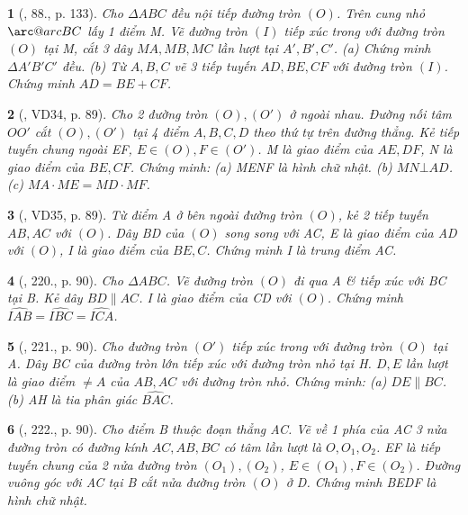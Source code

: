\documentclass{article}
\makeatletter
\newcommand{\arc@char}{{\usefont{U}{tipa}{m}{n}\symbol{62}}}%
\newcommand{\arc}[1]{\mathpalette\arc@arc{#1}}
\newcommand{\arc@arc}[2]{%
	\sbox0{$\m@th#1#2$}%
	\vbox{
		\hbox{\resizebox{\wd0}{\height}{\arc@char}}
		\nointerlineskip
		\box0
	}%
}
\newtheorem{baitoan}{}
\makeatother
\begin{document}
\begin{baitoan}[\cite{Tuyen_Toan_9_old}, 88., p. 133]
	Cho $\Delta ABC$ đều nội tiếp đường tròn $(O)$. Trên cung nhỏ $\arc{BC}$ lấy 1 điểm M. Vẽ đường tròn $(I)$ tiếp xúc trong với đường tròn $(O)$ tại M, cắt 3 dây $MA,MB,MC$ lần lượt tại $A',B',C'$. (a) Chứng minh $\Delta A'B'C'$ đều. (b) Từ $A,B,C$ vẽ 3 tiếp tuyến $AD,BE,CF$ với đường tròn $(I)$. Chứng minh $AD = BE + CF$.
\end{baitoan}

\begin{baitoan}[\cite{Binh_Toan_9_tap_2}, VD34, p. 89]
	Cho 2 đường tròn $(O),(O')$ ở ngoài nhau. Đường nối tâm $OO'$ cắt $(O),(O')$ tại 4 điểm $A,B,C,D$ theo thứ tự trên đường thẳng. Kẻ tiếp tuyến chung ngoài EF, $E\in(O),F\in(O')$. M là giao điểm của $AE,DF$, N là giao điểm của $BE,CF$. Chứng minh: (a) MENF là hình chữ nhật. (b) $MN\bot AD$. (c) $MA\cdot ME = MD\cdot MF$.
\end{baitoan}

\begin{baitoan}[\cite{Binh_Toan_9_tap_2}, VD35, p. 89]
	Từ điểm A ở bên ngoài đường tròn $(O)$, kẻ 2 tiếp tuyến $AB,AC$ với $(O)$. Dây BD của $(O)$ song song với AC, E là giao điểm của AD với $(O)$, I là giao điểm của $BE,C$. Chứng minh I là trung điểm AC.
\end{baitoan}

\begin{baitoan}[\cite{Binh_Toan_9_tap_2}, 220., p. 90]
	Cho $\Delta ABC$. Vẽ đường tròn $(O)$ đi qua A \& tiếp xúc với BC tại B. Kẻ dây $BD\parallel AC$. I là giao điểm của CD với $(O)$. Chứng minh $\widehat{IAB} = \widehat{IBC} = \widehat{ICA}$.
\end{baitoan}

\begin{baitoan}[\cite{Binh_Toan_9_tap_2}, 221., p. 90]
	Cho đường tròn $(O')$ tiếp xúc trong với đường tròn $(O)$ tại A. Dây BC của đường tròn lớn tiếp xúc với đường tròn nhỏ tại H. $D,E$ lần lượt là giao điểm $\ne A$ của $AB,AC$ với đường tròn nhỏ. Chứng minh: (a) $DE\parallel BC$. (b) AH là tia phân giác $\widehat{BAC}$.
\end{baitoan}

\begin{baitoan}[\cite{Binh_Toan_9_tap_2}, 222., p. 90]
	Cho điểm B thuộc đoạn thẳng AC. Vẽ về 1 phía của AC 3 nửa đường tròn có đường kính $AC,AB,BC$ có tâm lần lượt là $O,O_1,O_2$. EF là tiếp tuyến chung của 2 nửa đường tròn $(O_1),(O_2)$, $E\in(O_1),F\in(O_2)$. Đường vuông góc với AC tại B cắt nửa đường tròn $(O)$ ở D. Chứng minh BEDF là hình chữ nhật.
\end{baitoan}
\end{document}
